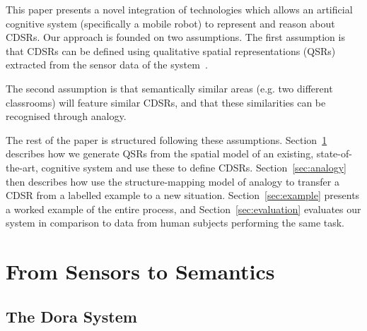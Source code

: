 \documentclass[letterpaper]{article}
\begin{document}

This paper presents a novel integration of technologies which allows an artificial cognitive system (specifically a mobile robot) to represent and reason about CDSRs. Our approach is founded on two assumptions. The first assumption is that CDSRs can be defined using qualitative spatial representations (QSRs) extracted from the sensor data of the system~\cite{Cohn:2001}. 

The second assumption is that semantically similar areas (e.g. two different classrooms) will feature similar CDSRs, and that these similarities can be recognised through analogy. 

The rest of the paper is structured following these assumptions. Section~\ref{sec:qsr-gen} describes how we generate QSRs from the spatial model of an existing, state-of-the-art, cognitive system and use these to define CDSRs. Section~\ref{sec:analogy} then describes how use the structure-mapping model of analogy \cite{Gentner1983a} to transfer a CDSR from a labelled example to a new situation. Section~\ref{sec:example} presents a worked example of the entire process, and Section~\ref{sec:evaluation} evaluates our system in comparison to data from human subjects performing the same task.


\section{From Sensors to Semantics}\label{sec:qsr-gen}


\subsection{The Dora System}
\end{document}

